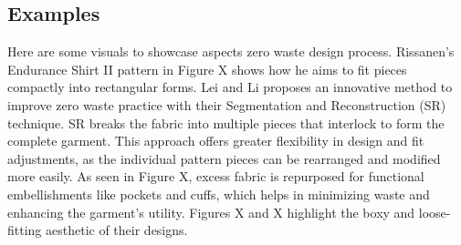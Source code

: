\subsection{Examples}
Here are some visuals to showcase aspects zero waste design process. Rissanen's Endurance Shirt II pattern in Figure X shows how he aims to fit pieces compactly into rectangular forms. Lei and Li proposes an innovative method to improve zero waste practice with their Segmentation and Reconstruction (SR) technique. SR breaks the fabric into multiple pieces that interlock to form the complete garment. This approach offers greater flexibility in design and fit adjustments, as the individual pattern pieces can be rearranged and modified more easily. As seen in Figure X, excess fabric is repurposed for functional embellishments like pockets and cuffs, which helps in minimizing waste and enhancing the garment’s utility. Figures X and X highlight the boxy and loose-fitting aesthetic of their designs.

